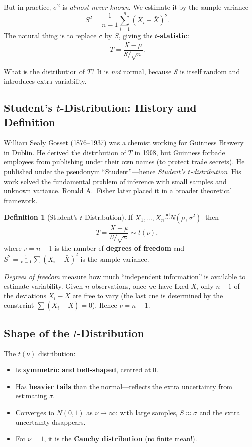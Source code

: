 \documentclass[12pt, a4paper, oneside]{book}
\theoremstyle{definition}
\newtheorem{definition}{Definition}[section]
\theoremstyle{plain}
\theoremstyle{remark}
\newcommand{\iid}{\overset{\text{iid}}{\sim}}
\begin{document}
But in practice, $\sigma^2$ is \emph{almost never known}.  We estimate it
by the sample variance
\[
  S^2 = \frac{1}{n-1}\sum_{i=1}^n (X_i - \bar{X})^2.
\]
The natural thing is to replace $\sigma$ by $S$, giving the \textbf{$t$-statistic}:
\[
  T = \frac{\bar{X}-\mu}{S/\sqrt{n}}.
\]

What is the distribution of $T$?  It is \emph{not} normal, because $S$ is
itself random and introduces extra variability.

\subsection{Student's $t$-Distribution: History and Definition}

\begin{historicalbox}
William Sealy Gosset (1876--1937) was a chemist working for Guinness Brewery
in Dublin.  He derived the distribution of $T$ in 1908, but Guinness forbade
employees from publishing under their own names (to protect trade secrets).
He published under the pseudonym ``Student''---hence \emph{Student's
$t$-distribution}.  His work solved the fundamental problem of inference with
small samples and unknown variance.  Ronald A.\ Fisher later placed it in a
broader theoretical framework.
\end{historicalbox}

\begin{definition}[Student's $t$-Distribution]
If $X_1,\ldots,X_n \iid N(\mu,\sigma^2)$, then
\[
  T = \frac{\bar{X}-\mu}{S/\sqrt{n}} \sim t(\nu),
\]
where $\nu = n-1$ is the number of \textbf{degrees of freedom} and
$S^2 = \frac{1}{n-1}\sum(X_i-\bar{X})^2$ is the sample variance.
\end{definition}

\begin{intuition}
\emph{Degrees of freedom} measure how much ``independent information'' is
available to estimate variability.  Given $n$ observations, once we have
fixed $\bar{X}$, only $n-1$ of the deviations $X_i-\bar{X}$ are free to
vary (the last one is determined by the constraint
$\sum(X_i-\bar{X})=0$).  Hence $\nu = n-1$.
\end{intuition}

\subsection{Shape of the $t$-Distribution}

The $t(\nu)$ distribution:
\begin{itemize}
  \item Is \textbf{symmetric and bell-shaped}, centred at 0.
  \item Has \textbf{heavier tails} than the normal---reflects the extra
        uncertainty from estimating $\sigma$.
  \item Converges to $N(0,1)$ as $\nu\to\infty$: with large samples,
        $S\approx\sigma$ and the extra uncertainty disappears.
  \item For $\nu=1$, it is the \textbf{Cauchy distribution} (no finite mean!).
\end{itemize}
\end{document}
